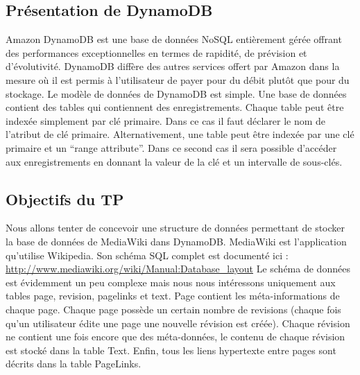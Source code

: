 \subsection{Présentation de DynamoDB}
Amazon DynamoDB est une base de données NoSQL entièrement gérée offrant des performances exceptionnelles en termes de rapidité, de prévision et d'évolutivité. DynamoDB diffère des autres services offert par Amazon dans la mesure où il est permis à l'utilisateur de payer pour du débit plutôt que pour du stockage.
Le modèle de données de DynamoDB est simple. Une base de données contient des tables qui contiennent des enregistrements. Chaque table peut être indexée simplement par clé primaire. Dans ce cas il faut déclarer le nom de l’atribut de clé primaire. Alternativement, une table peut être indexée par une clé primaire et un “range attribute”. Dans ce second cas il sera possible d’accéder aux enregistrements en donnant la valeur de la clé et un intervalle de sous-clés.

\subsection{Objectifs du TP}
Nous allons tenter de concevoir une structure de données permettant de stocker la base de données de MediaWiki dans DynamoDB. MediaWiki est l’application qu’utilise Wikipedia. Son schéma SQL complet est documenté ici : \url{http://www.mediawiki.org/wiki/Manual:Database_layout}
Le schéma de données est évidemment un peu complexe mais nous nous intéressons uniquement aux tables page, revision, pagelinks et text. Page contient les méta-informations de chaque page. Chaque page possède un certain nombre de revisions (chaque fois qu’un utilisateur édite une page une nouvelle révision est créée). Chaque révision ne contient une fois encore que des méta-données, le contenu de chaque révision est stocké dans la table Text. Enﬁn, tous les liens hypertexte entre pages sont décrits dans la table PageLinks.